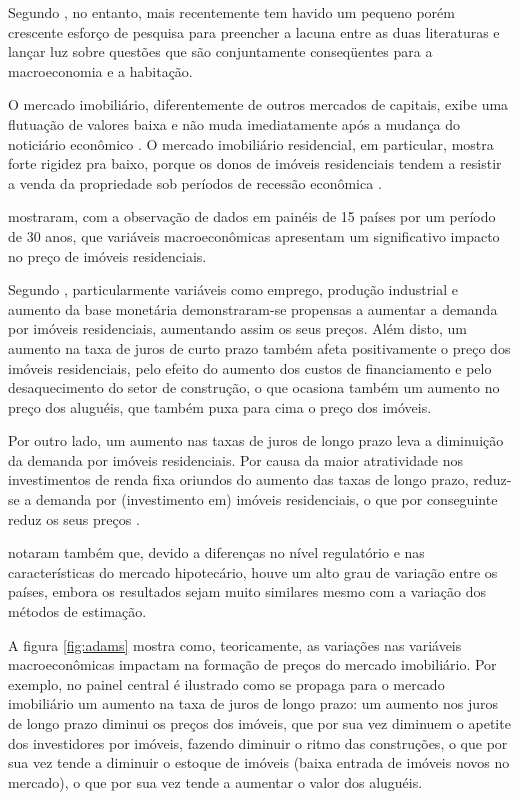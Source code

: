 \documentclass[
	12pt,				%
	oneside,			%
	a4paper,			%
	chapter=TITLE,		%
	section=TITLE,		%
	english,			%
	brazil				%
	]{abntex2}
\begin{document}
Segundo \textcite[p.~4]{LEUNG}, no entanto, mais recentemente tem havido
um pequeno porém crescente esforço de pesquisa para preencher a lacuna
entre as duas literaturas e lançar luz sobre questões que são
conjuntamente conseqüentes para a macroeconomia e a habitação.

O mercado imobiliário, diferentemente de outros mercados de capitais,
exibe uma flutuação de valores baixa e não muda imediatamente após a
mudança do noticiário econômico \autocite[3]{ADAMS201038}. O mercado
imobiliário residencial, em particular, mostra forte rigidez pra baixo,
porque os donos de imóveis residenciais tendem a resistir a venda da
propriedade sob períodos de recessão econômica \autocite[
129]{Case2000}.

\textcite{ADAMS201038} mostraram, com a observação de dados em painéis
de 15 países por um período de 30 anos, que variáveis macroeconômicas
apresentam um significativo impacto no preço de imóveis residenciais.

Segundo \textcite[p.~18]{ADAMS201038}, particularmente variáveis como
emprego, produção industrial e aumento da base monetária demonstraram-se
propensas a aumentar a demanda por imóveis residenciais, aumentando
assim os seus preços. Além disto, um aumento na taxa de juros de curto
prazo também afeta positivamente o preço dos imóveis residenciais, pelo
efeito do aumento dos custos de financiamento e pelo desaquecimento do
setor de construção, o que ocasiona também um aumento no preço dos
aluguéis, que também puxa para cima o preço dos imóveis.

Por outro lado, um aumento nas taxas de juros de longo prazo leva a
diminuição da demanda por imóveis residenciais. Por causa da maior
atratividade nos investimentos de renda fixa oriundos do aumento das
taxas de longo prazo, reduz-se a demanda por (investimento em) imóveis
residenciais, o que por conseguinte reduz os seus preços
\autocite[19]{ADAMS201038}.

\textcite{ADAMS201038} notaram também que, devido a diferenças no nível
regulatório e nas características do mercado hipotecário, houve um alto
grau de variação entre os países, embora os resultados sejam muito
similares mesmo com a variação dos métodos de estimação.

A figura \ref{fig:adams} mostra como, teoricamente, as variações nas
variáveis macroeconômicas impactam na formação de preços do mercado
imobiliário. Por exemplo, no painel central é ilustrado como se propaga
para o mercado imobiliário um aumento na taxa de juros de longo prazo:
um aumento nos juros de longo prazo diminui os preços dos imóveis, que
por sua vez diminuem o apetite dos investidores por imóveis, fazendo
diminuir o ritmo das construções, o que por sua vez tende a diminuir o
estoque de imóveis (baixa entrada de imóveis novos no mercado), o que
por sua vez tende a aumentar o valor dos aluguéis.
\end{document}
